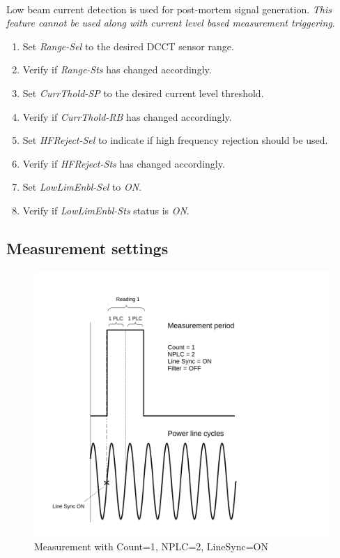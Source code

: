 \documentclass[openany]{article}
\begin{document}
		\paragraph{} Low beam current detection is used for post-mortem signal generation. \emph{This feature cannot be used along with current level based measurement triggering}.

			\begin{enumerate}
				\item Set \emph{Range-Sel} to the desired DCCT sensor range.
				\item Verify if \emph{Range-Sts} has changed accordingly.
				\item Set \emph{CurrThold-SP} to the desired current level threshold.
				\item Verify if \emph{CurrThold-RB} has changed accordingly.
				\item Set \emph{HFReject-Sel} to indicate if high frequency rejection should be used.
				\item Verify if \emph{HFReject-Sts} has changed accordingly.
				\item Set \emph{LowLimEnbl-Sel} to \emph{ON}.
				\item Verify if \emph{LowLimEnbl-Sts} status is \emph{ON}.
			\end{enumerate}

	\subsection{Measurement settings}

		\begin{figure}[!h]
			\caption{Measurement with Count=1, NPLC=2, LineSync=ON}
			\label{fig:meas-param1}
			\centering
			\includegraphics[width=1.0\textwidth]{dcct-meas-param1-image}
		\end{figure}
\end{document}
